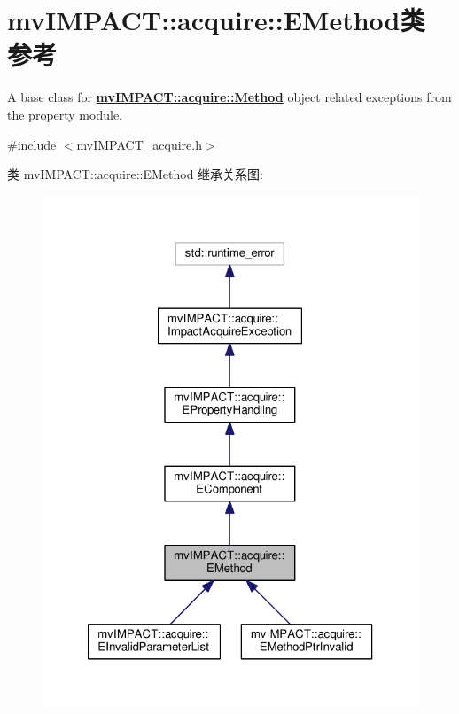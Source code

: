 \hypertarget{classmv_i_m_p_a_c_t_1_1acquire_1_1_e_method}{\section{mv\+I\+M\+P\+A\+C\+T\+:\+:acquire\+:\+:E\+Method类 参考}
\label{classmv_i_m_p_a_c_t_1_1acquire_1_1_e_method}
}


A base class for {\bfseries \hyperlink{classmv_i_m_p_a_c_t_1_1acquire_1_1_method}{mv\+I\+M\+P\+A\+C\+T\+::acquire\+::\+Method}} object related exceptions from the property module.  




{\ttfamily \#include $<$mv\+I\+M\+P\+A\+C\+T\+\_\+acquire.\+h$>$}



类 mv\+I\+M\+P\+A\+C\+T\+:\+:acquire\+:\+:E\+Method 继承关系图\+:
\nopagebreak
\begin{figure}[H]
\begin{center}
\leavevmode
\includegraphics[width=323pt]{classmv_i_m_p_a_c_t_1_1acquire_1_1_e_method__inherit__graph}
\end{center}
\end{figure}


